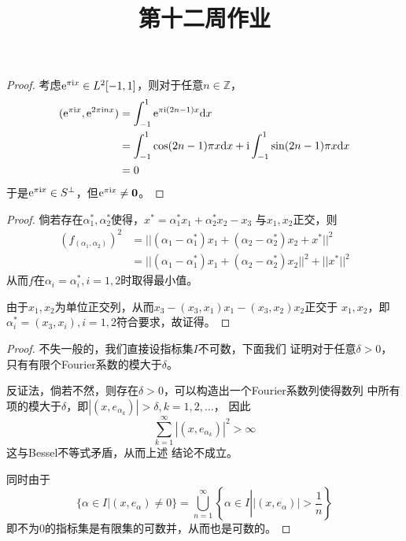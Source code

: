 \documentclass[cn]{homework}
\title{第十二周作业}
\newcommand{\img}{\mathrm i}
\begin{document}
    \maketitle

    \problem
    \begin{subproblem}[(\arabic*)]
        \item

        \item
        \begin{proof}
            考虑$\e^{\pi\img x}\in L^2[-1,1]$，则对于任意$n\in\mathbb Z$，
            \[\begin{aligned}
                (\e^{\pi\img x},\e^{2\pi\img nx})
                &=\int_{-1}^1\e^{\pi\img(2n-1)x}\diff x\\
                &=\int_{-1}^1\cos(2n-1)\pi x\diff x+\img\int_{-1}^1\sin(2n-1)\pi x\diff x\\
                &=0
            \end{aligned}\]
            于是$\e^{\pi\img x}\in S^\perp$，但$\e^{\pi\img x}\neq\boldsymbol 0$。
        \end{proof}
    \end{subproblem}

    \problem
    \begin{proof}
        倘若存在$\alpha_1^*,\alpha_2^*$使得，$x^*=\alpha_1^*x_1+\alpha_2^*x_2-x_3$
        与$x_1,x_2$正交，则
        \[\begin{aligned}
            (f_(\alpha_1,\alpha_2))^2
            &=||(\alpha_1-\alpha_1^*)x_1+(\alpha_2-\alpha_2^*)x_2+x^*||^2\\
            &=||(\alpha_1-\alpha_1^*)x_1+(\alpha_2-\alpha_2^*)x_2||^2
            +||x^*||^2
        \end{aligned}\]
        从而$f$在$\alpha_i=\alpha_i^*,i=1,2$时取得最小值。

        由于$x_1,x_2$为单位正交列，从而$x_3-(x_3,x_1)x_1-(x_3,x_2)x_2$正交于
        $x_1,x_2$，即$\alpha_i^*=(x_3,x_i),i=1,2$符合要求，故证得。
    \end{proof}

    \problem
    \begin{proof}
        不失一般的，我们直接设指标集$I$不可数，下面我们
        证明对于任意$\delta>0$，只有有限个Fourier系数的模大于$\delta$。

        反证法，倘若不然，则存在$\delta>0$，可以构造出一个Fourier系数列使得数列
        中所有项的模大于$\delta$，即$|(x,e_{\alpha_k})|>\delta,k=1,2,\ldots$，
        因此
        \[\sum_{k=1}^\infty|(x,e_{\alpha_k})|^2>\infty\]
        这与Bessel不等式矛盾，从而上述
        结论不成立。

        同时由于
        \[\{\alpha\in I|(x,e_\alpha)\neq 0\}
        =\bigcup_{n=1}^\infty\left\{\alpha\in I\left||(x,e_\alpha)|>\frac{1}{n}\right.\right\}\]
        即不为0的指标集是有限集的可数并，从而也是可数的。
    \end{proof}
\end{document}
